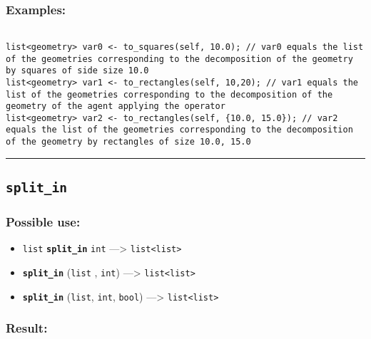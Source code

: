 \documentclass[]{book}
\providecommand{\tightlist}{%
  \setlength{\itemsep}{0pt}\setlength{\parskip}{0pt}}
\theoremstyle{definition}
\theoremstyle{definition}
\theoremstyle{definition}
\theoremstyle{remark}
\begin{document}
\subsubsection{Examples:}\label{examples-344}

\begin{verbatim}
 
list<geometry> var0 <- to_squares(self, 10.0); // var0 equals the list of the geometries corresponding to the decomposition of the geometry by squares of side size 10.0 
list<geometry> var1 <- to_rectangles(self, 10,20); // var1 equals the list of the geometries corresponding to the decomposition of the geometry of the agent applying the operator 
list<geometry> var2 <- to_rectangles(self, {10.0, 15.0}); // var2 equals the list of the geometries corresponding to the decomposition of the geometry by rectangles of size 10.0, 15.0
\end{verbatim}

\begin{center}\rule{0.5\linewidth}{\linethickness}\end{center}

\subsection{\texorpdfstring{\texttt{split\_in}}{split\_in}}\label{split_in}

\subsubsection{Possible use:}\label{possible-use-494}

\begin{itemize}
\tightlist
\item
  \texttt{list} \textbf{\texttt{split\_in}} \texttt{int}
  ---\textgreater{} \texttt{list\textless{}list\textgreater{}}
\item
  \textbf{\texttt{split\_in}} (\texttt{list} , \texttt{int})
  ---\textgreater{} \texttt{list\textless{}list\textgreater{}}
\item
  \textbf{\texttt{split\_in}} (\texttt{list}, \texttt{int},
  \texttt{bool}) ---\textgreater{}
  \texttt{list\textless{}list\textgreater{}}
\end{itemize}

\subsubsection{Result:}\label{result-478}
\end{document}
